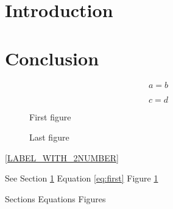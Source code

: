 \documentclass{article}
\begin{document}
\section{Introduction} \label{sec:intro} %

\section{Conclusion}
\label{sec:conclusion}                %

\begin{equation}
a = b
\label{eq:first}                      %
\end{equation}

\begin{equation}
c = d
\label{eq:second}                     %
\end{equation}

\begin{figure}
\centering
\caption[First image]{First figure}
\label{fig:start}                     %
\end{figure}

\begin{figure}
\centering
\caption[Last image]{Last figure}
\label{fig:end}                       %
\end{figure}

\label{LABEL_WITH_2NUMBER}
\ref{LABEL_WITH_2NUMBER}

See Section \ref{sec:intro}           %
Equation \ref{eq:first}               %
Figure \ref{fig:start}                %

Sections 
Equations 
Figures 


\end{document}
